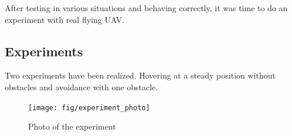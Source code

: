 \documentclass{article}
\begin{document}
After testing in various situations and behaving correctly, it was time to do an experiment with real flying UAV.

\subsection{Experiments}

Two experiments have been realized. Hovering at a steady position without obstacles and avoidance with one obstacle.

\begin{figure}[h]
\begin{center}
\texttt{[image: fig/experiment\_photo]}
\caption{Photo of the experiment}
\label{fig:move_blocking}
\end{center}
\end{figure}
\end{document}
